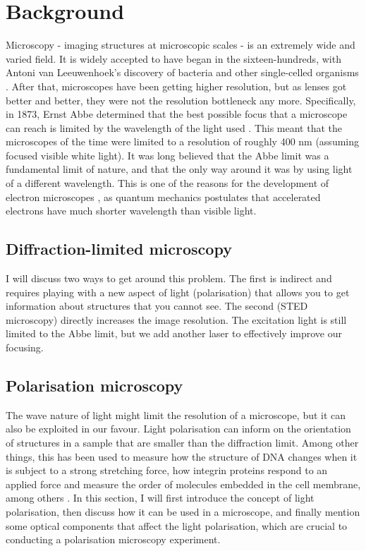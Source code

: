 \chapter{Background}


Microscopy - imaging structures at microscopic scales - is an extremely wide and varied field. It is widely accepted to have began in the sixteen-hundreds, with Antoni van Leeuwenhoek's discovery of bacteria and other single-celled organisms . After that, microscopes have been getting higher resolution, but as lenses got better and better, they were not the resolution bottleneck any more. Specifically, in 1873, Ernst Abbe determined that the best possible focus that a microscope can reach is limited by the wavelength of the light used . This meant that the microscopes of the time were limited to a resolution of roughly 400 nm (assuming focused visible white light). It was long believed that the Abbe limit was a fundamental limit of nature, and that the only way around it was by using light of a different wavelength. This is one of the reasons for the development of electron microscopes , as quantum mechanics postulates that accelerated electrons have much shorter wavelength than visible light. 

\section{Diffraction-limited microscopy}

 I will discuss two ways to get around this problem. The first is indirect and requires playing with a new aspect of light (polarisation) that allows you to get information about structures that you cannot see. The second (STED microscopy) directly increases the image resolution. The excitation light is still limited to the Abbe limit, but we add another laser to effectively improve our focusing.

\section{Polarisation microscopy}

The wave nature of light might limit the resolution of a microscope, but it can also be exploited in our favour. Light polarisation can inform on the orientation of structures in a sample that are smaller than the diffraction limit. Among other things, this has been used to measure how the structure of DNA changes when it is subject to a strong stretching force, how integrin proteins respond to an applied force and measure the order of molecules embedded in the cell membrane, among others \cite{Backer2019, Nordenfelt2017, Swaminathan2017, Brasselet2013}. In this section, I will first introduce the concept of light polarisation, then discuss how it can be used in a microscope, and finally mention some optical components that affect the light polarisation, which are crucial to conducting a polarisation microscopy experiment.

